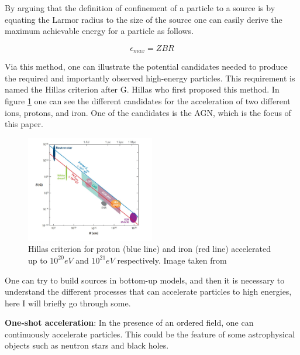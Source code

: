 \documentclass{article}
\begin{document}
By arguing that the definition of confinement of a particle to a source is by equating the Larmor radius to the size of the source one can 
easily derive the maximum achievable energy for a particle as follows.%

\begin{equation}
    \epsilon_{max} = ZBR
\end{equation}

Via this method, one can illustrate the potential candidates needed to produce the required and importantly observed high-energy particles. 
This requirement is named the Hillas criterion after G. Hillas who first proposed this method.
In figure \ref{fig:hillas_c} one can see the different candidates for the acceleration of two different ions, protons, and iron. One of the candidates is the AGN, which is the focus of this paper.

\begin{figure}
    \centering
    \includegraphics[width = 0.5\textwidth]{hillas_criterion.jpeg}
    \caption{Hillas criterion for proton (blue line) and iron (red line) accelerated up to $10^{20}eV$ and $10^{21}eV$ respectively. Image taken from \cite{doi:10.1146/annurev-astro-081710-102620}}
    \label{fig:hillas_c}
\end{figure}


One can try to build sources in bottom-up models, and then it is necessary to understand the different processes that can accelerate particles to high energies, here I will briefly go through some. 

\textbf{One-shot acceleration}:
In the presence of an ordered field, one can continuously accelerate particles. This could be the feature of some astrophysical objects such as neutron stars and black holes.%
\end{document}
